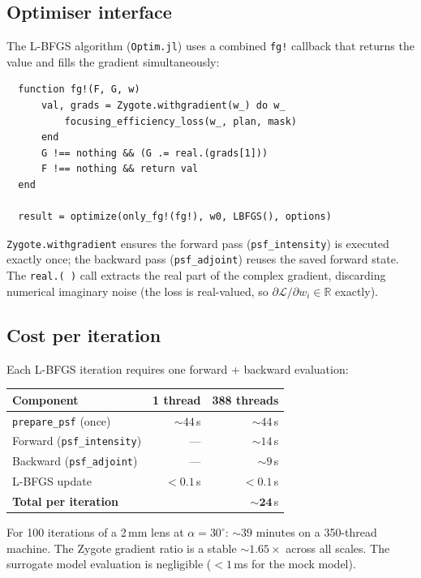 \documentclass[11pt,a4paper]{article}
\begin{document}
\subsection{Optimiser interface}

The L-BFGS algorithm (\texttt{Optim.jl}) uses a combined \texttt{fg!} callback
that returns the value and fills the gradient simultaneously:
\begin{verbatim}
  function fg!(F, G, w)
      val, grads = Zygote.withgradient(w_) do w_
          focusing_efficiency_loss(w_, plan, mask)
      end
      G !== nothing && (G .= real.(grads[1]))
      F !== nothing && return val
  end

  result = optimize(only_fg!(fg!), w0, LBFGS(), options)
\end{verbatim}

\noindent
\texttt{Zygote.withgradient} ensures the forward pass (\texttt{psf\_intensity})
is executed exactly once; the backward pass (\texttt{psf\_adjoint}) reuses the
saved forward state.  The \texttt{real.(\,)} call extracts the real part of
the complex gradient, discarding numerical imaginary noise
(the loss is real-valued, so $\partial\mathcal{L}/\partial w_i \in \mathbb{R}$
exactly).

\subsection{Cost per iteration}

Each L-BFGS iteration requires one forward + backward evaluation:

\begin{center}
\begin{tabular}{@{}l r r@{}}
\toprule
\textbf{Component} & \textbf{1 thread} & \textbf{388 threads} \\
\midrule
\texttt{prepare\_psf} (once) & ${\sim}44$\,s & ${\sim}44$\,s \\
Forward (\texttt{psf\_intensity}) & --- & ${\sim}14$\,s \\
Backward (\texttt{psf\_adjoint}) & --- & ${\sim}9$\,s \\
L-BFGS update & $< 0.1$\,s & $< 0.1$\,s \\
\midrule
\textbf{Total per iteration} & & ${\sim}\mathbf{24}$\,s \\
\bottomrule
\end{tabular}
\end{center}

\noindent
For 100 iterations of a 2\,mm lens at $\alpha = 30^\circ$: ${\sim}39$ minutes
on a 350-thread machine.  The Zygote gradient ratio is a stable
${\sim}1.65\times$ across all scales.  The surrogate model evaluation is
negligible ($< 1$\,ms for the mock model).
\end{document}
